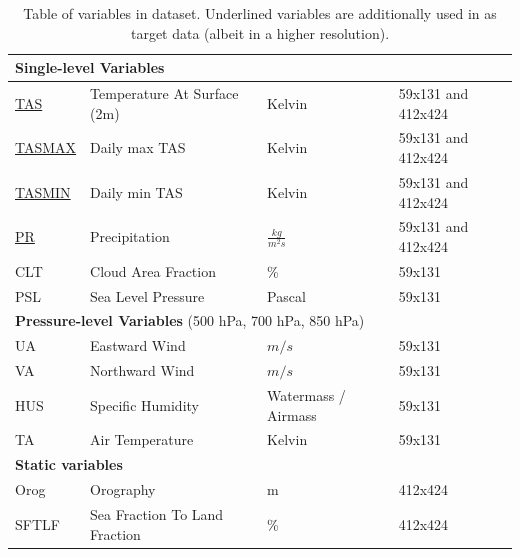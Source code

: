 \begin{table}[bt]
    \centering
    \begin{tabular}{l|l|l|l}
        \multicolumn{3}{l}{\textbf{Single-level Variables}} \\ \toprule
        \underline{TAS}     & Temperature At Surface (2m)   & Kelvin                & 59x131 and 412x424 \\ \midrule
        \underline{TASMAX}  & Daily max TAS                 & Kelvin                & 59x131 and 412x424 \\ \midrule
        \underline{TASMIN}  & Daily min TAS                 & Kelvin                & 59x131 and 412x424 \\ \midrule
        \underline{PR}      & Precipitation                 & $\frac{kg}{m^2 s}$    & 59x131 and 412x424 \\ \midrule
        CLT                 & Cloud Area Fraction           & \%                    & 59x131 \\ \midrule
        PSL                 & Sea Level Pressure            & Pascal                & 59x131 \\ \midrule
        \multicolumn{3}{l}{\textbf{Pressure-level Variables} (500 hPa, 700 hPa, 850 hPa)} \\ \toprule
        UA                  & Eastward Wind                 & $m/s$                 & 59x131 \\ \midrule
        VA                  & Northward Wind                &  $m/s$                & 59x131 \\ \midrule
        HUS                 & Specific Humidity             & Watermass / Airmass   & 59x131 \\ \midrule
        TA                  & Air Temperature               & Kelvin                & 59x131 \\ \midrule
        \multicolumn{3}{l}{\textbf{Static variables}} \\ \toprule
        Orog                & Orography                     & m                     & 412x424 \\ \midrule
        SFTLF               & Sea Fraction To Land Fraction & \%                    & 412x424 \\ \midrule
    \end{tabular}
    \caption{Table of variables in dataset. Underlined variables are additionally used in as target data (albeit in a higher resolution).}
    \label{tab:variables}
\end{table}

